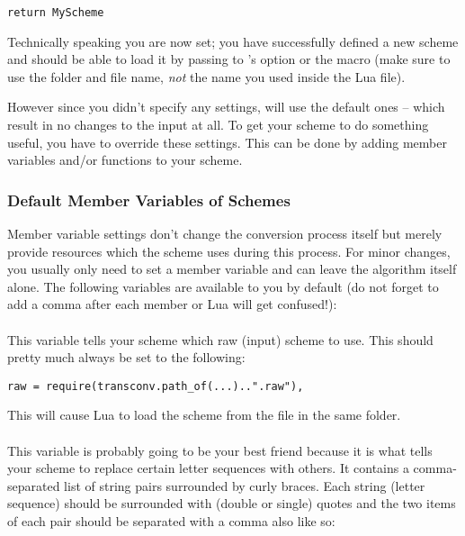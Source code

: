 \documentclass{ltxdockit}
\begin{document}
\begin{lstlisting}
return MyScheme
\end{lstlisting}

Technically speaking you are now set; you have successfully defined a new scheme
and should be able to load it by passing  to
's  option or the
 macro (make sure to use the
folder and file name, \emph{not} the name you used inside the Lua file).

However since you didn't specify any settings,  will use the
default ones -- which result in no changes to the input at all. To get your
scheme to do something useful, you have to override these settings. This can be
done by adding member variables and/or functions to your scheme.

\subsubsection{Default Member Variables of Schemes}

Member variable settings don't change the conversion process itself but merely
provide resources which the scheme uses during this process. For minor changes,
you usually only need to set a member variable and can leave the algorithm
itself alone. The following variables are available to you by default (do not
forget to add a comma after each member or Lua will get confused!):

\paragraph{}

This variable tells your scheme which raw (input) scheme to use. This should
pretty much always be set to the following:

\begin{lstlisting}
raw = require(transconv.path_of(...)..".raw"),
\end{lstlisting}

This will cause Lua to load the scheme from the  file in the same
folder.

\paragraph{}

This variable is probably going to be your best friend because it is what tells
your scheme to replace certain letter sequences with others. It contains a
comma-separated list of string pairs surrounded by curly braces. Each string
(letter sequence) should be surrounded with (double or single) quotes and the
two items of each pair should be separated with a comma also like so:
\end{document}
